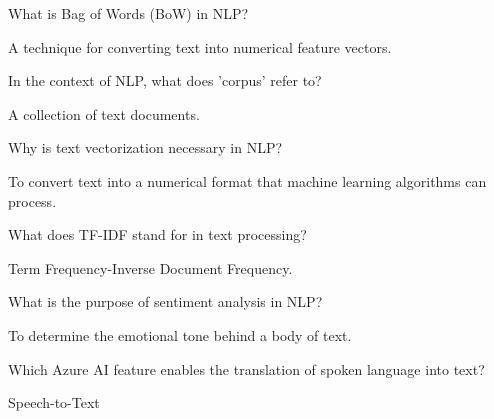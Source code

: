 \begin{qanda}
	\begin{question}
What is Bag of Words (BoW) in NLP?
	\end{question}
	\begin{answer}
A technique for converting text into numerical feature vectors.
	\end{answer}
\end{qanda}

\begin{qanda}
	\begin{question}
In the context of NLP, what does 'corpus' refer to?
	\end{question}
	\begin{answer}
A collection of text documents.
	\end{answer}
\end{qanda}

\begin{qanda}
	\begin{question}
Why is text vectorization necessary in NLP?
	\end{question}
	\begin{answer}
To convert text into a numerical format that machine learning algorithms can process.
	\end{answer}
\end{qanda}

\begin{qanda}
	\begin{question}
What does TF-IDF stand for in text processing?
	\end{question}
	\begin{answer}
Term Frequency-Inverse Document Frequency.
	\end{answer}
\end{qanda}

\begin{qanda}
	\begin{question}
What is the purpose of sentiment analysis in NLP?
	\end{question}
	\begin{answer}
To determine the emotional tone behind a body of text.
	\end{answer}
\end{qanda}

\begin{qanda}
	\begin{question}
Which Azure AI feature enables the translation of spoken language into text?
	\end{question}
	\begin{answer}
Speech-to-Text
	\end{answer}
\end{qanda}


